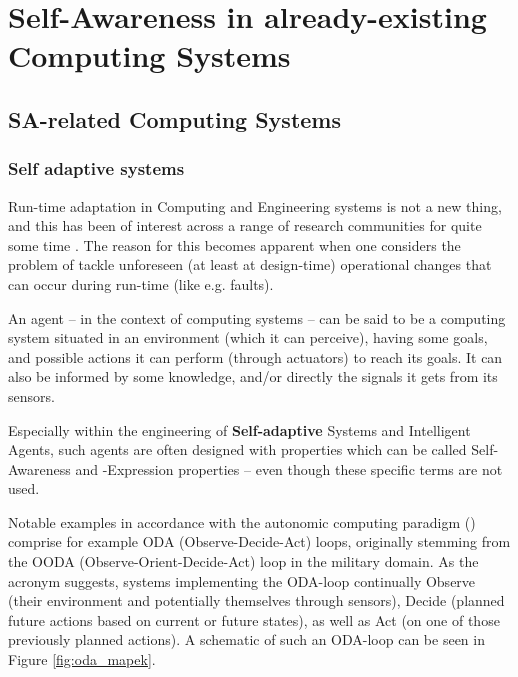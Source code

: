 \section{Self-Awareness in already-existing Computing Systems}

	\subsection{SA-related Computing Systems}
	
		\subsubsection{Self adaptive systems}
		Run-time adaptation in Computing and Engineering systems is not a new thing, and this has been of interest across a range of research communities for quite some time \cite{sacs16_ch4}. The reason for this becomes apparent when one considers the problem of tackle unforeseen (at least at design-time) operational changes that can occur during run-time (like e.g. faults).

		An agent -- in the context of computing systems -- can be said to be a computing system situated in an environment (which it can perceive), having some goals, and possible actions it can perform (through actuators) to reach its goals. It can also be informed by some knowledge, and/or directly the signals it gets from its sensors.

		Especially within the engineering of \textbf{Self-adaptive} Systems and Intelligent Agents, such agents are often designed with properties which can be called Self-Awareness and -Expression properties -- even though these specific terms are not used.

		Notable examples in accordance with the autonomic computing paradigm (\cite{sacs16_ch4}) comprise for example ODA (Observe-Decide-Act) loops, originally stemming from the OODA (Observe-Orient-Decide-Act) loop in the military domain. As the acronym suggests, systems implementing the ODA-loop continually Observe (their environment and potentially themselves through sensors), Decide (planned future actions based on current or future states), as well as Act (on one of those previously planned actions). A schematic of such an ODA-loop can be seen in Figure \ref{fig:oda_mapek}.


